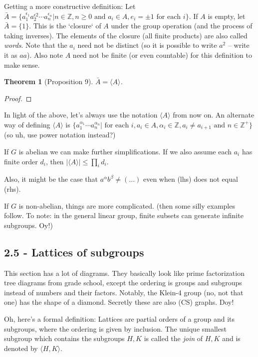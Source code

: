 \documentclass[1    0pt, answers]{exam} \renewcommand{\baselinestretch}{1.05}
\theoremstyle{plain}
\newtheorem{theorem}{Theorem}
\theoremstyle{definition}
\begin{document}
\begin{questions}
Getting a more constructive definition: Let $\bar{A} = \{ a_1^{\epsilon_1} a_2^{\epsilon2} \cdots a_n^{\epsilon_n} | n \in \mathbb{Z}, n \geq 0 \text{ and } a_i \in A, e_i = \pm 1 \text{ for each } i \}$. If $A$ is empty, let $\bar{A} = \{1\}$. This is the `closure` of $A$ under the group operation (and the process of taking inverses). The elements of the closure (all finite products) are also called \emph{words}. Note that the $a_i$ need not be distinct (so it is possible to write $a^2$ -- write it as $aa$). Also note $A$ need not be finite (or even countable) for this definition to make sense.

\begin{theorem}[Proposition 9]
$\bar{A} = \langle A \rangle$.
\end{theorem}
\begin{proof}
\end{proof}

In light of the above, let's always use the notation $\langle A \rangle$ from now on. An alternate way of defining $\langle A \rangle$ is $\{ a_1^{\alpha_1} \cdots a_n^{\alpha_n} | \text{ for each } i, a_i \in A, \alpha_i \in \mathbb{Z}, a_i \neq a_{i + 1} \text{ and } n \in \mathbb{Z}^{+} \}$ (so uh, use power notation instead?)

If $G$ is abelian we can make further simplifications. 
If we also assume each $a_i$ has finite order $d_i$, then $| \langle A \rangle | \leq \prod_{i} d_i$.

Also, it might be the case that $a^{\alpha} b^{\beta} \neq (...)$ even when (lhs) does not equal (rhs).

If $G$ is non-abelian, things are more complicated. (then some silly examples follow. To note: in the general linear group, finite subsets can generate infinite subgroups. Oy!)

\subsection{2.5 - Lattices of subgroups}
This section has a lot of diagrams. They basically look like prime factorization tree diagrams from grade school, except the ordering is groups and subgroups instead of numbers and their factors.
Notably, the Klein-4 group (no, not that one) has the shape of a diamond.
Secretly these are also (CS) graphs. Doy!

Oh, here's a formal definition: Lattices are partial orders of a group and its subgroups, where the ordering is given by inclusion.
The unique smallest subgroup which contains the subgroups $H, K$ is called the \emph{join} of $H, K$ and is denoted by $\langle H, K \rangle$.


\end{questions}
\end{document}
